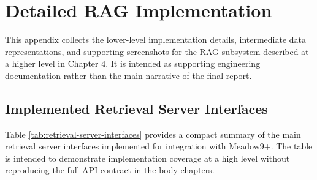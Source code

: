 \chapter{Detailed RAG Implementation}

This appendix collects the lower-level implementation details, intermediate data representations, and supporting screenshots for the RAG subsystem described at a higher level in Chapter 4. It is intended as supporting engineering documentation rather than the main narrative of the final report.

\section{Implemented Retrieval Server Interfaces}
Table \ref{tab:retrieval-server-interfaces} provides a compact summary of the main retrieval server interfaces implemented for integration with Meadow9+. The table is intended to demonstrate implementation coverage at a high level without reproducing the full API contract in the body chapters.

